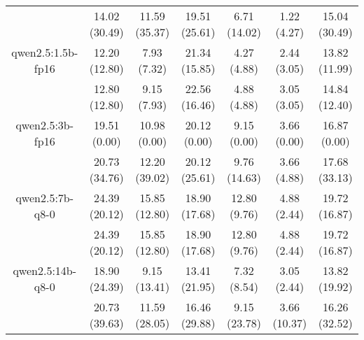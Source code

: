 \begin{table}[]
{\begin{tabular}{ccccccc}
        

        \multicolumn{1}{c|}{} & 14.02 (30.49) & 11.59 (35.37) & \multicolumn{1}{c|}{19.51 (25.61)} & 6.71 (14.02) & \multicolumn{1}{c|}{1.22 (4.27)} & 15.04 (30.49) \\
        \cline{1-7}
        

        \multicolumn{1}{c|}{qwen2.5:1.5b-fp16} & 12.20 (12.80) & 7.93 (7.32) & \multicolumn{1}{c|}{21.34 (15.85)} & 4.27 (4.88) & \multicolumn{1}{c|}{2.44 (3.05)} & 13.82 (11.99) \\
        
        

        \multicolumn{1}{c|}{} & 12.80 (12.80) & 9.15 (7.93) & \multicolumn{1}{c|}{22.56 (16.46)} & 4.88 (4.88) & \multicolumn{1}{c|}{3.05 (3.05)} & 14.84 (12.40) \\
        \cline{1-7}
        

        \multicolumn{1}{c|}{qwen2.5:3b-fp16} & 19.51 (0.00) & 10.98 (0.00) & \multicolumn{1}{c|}{20.12 (0.00)} & 9.15 (0.00) & \multicolumn{1}{c|}{3.66 (0.00)} & 16.87 (0.00) \\
        
        

        \multicolumn{1}{c|}{} & 20.73 (34.76) & 12.20 (39.02) & \multicolumn{1}{c|}{20.12 (25.61)} & 9.76 (14.63) & \multicolumn{1}{c|}{3.66 (4.88)} & 17.68 (33.13) \\
        \cline{1-7}
        

        \multicolumn{1}{c|}{qwen2.5:7b-q8-0} & 24.39 (20.12) & 15.85 (12.80) & \multicolumn{1}{c|}{18.90 (17.68)} & 12.80 (9.76) & \multicolumn{1}{c|}{4.88 (2.44)} & 19.72 (16.87) \\
        
        

        \multicolumn{1}{c|}{} & 24.39 (20.12) & 15.85 (12.80) & \multicolumn{1}{c|}{18.90 (17.68)} & 12.80 (9.76) & \multicolumn{1}{c|}{4.88 (2.44)} & 19.72 (16.87) \\
        \cline{1-7}
        

        \multicolumn{1}{c|}{qwen2.5:14b-q8-0} & 18.90 (24.39) & 9.15 (13.41) & \multicolumn{1}{c|}{13.41 (21.95)} & 7.32 (8.54) & \multicolumn{1}{c|}{3.05 (2.44)} & 13.82 (19.92) \\
        
        

        \multicolumn{1}{c|}{} & 20.73 (39.63) & 11.59 (28.05) & \multicolumn{1}{c|}{16.46 (29.88)} & 9.15 (23.78) & \multicolumn{1}{c|}{3.66 (10.37)} & 16.26 (32.52) \\
        \cline{1-7}
        


\end{tabular}}
\end{table}
